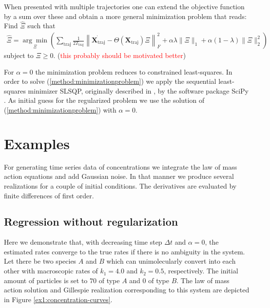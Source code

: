 \documentclass[oneside, abstracton, titlepage]{scrartcl}
\begin{document}
	When presented with multiple trajectories one can extend the objective function by a sum over these and obtain a more general minimization problem that reads: Find $\hat{\Xi}$ such that
	\begin{align}
		\hat{\Xi} = \underset{\Xi}{\arg\min}\left( \sum_{\text{traj}}\frac{1}{2T_{\text{traj}}}\left\| \dot{\textbf{X}_\text{traj}} - \Theta(\textbf{X}_\text{traj})\Xi \right\|_F^2 + \alpha\lambda\|\Xi\|_1 + \alpha(1-\lambda)\|\Xi\|_2^2 \right)
	\end{align}
	subject to $\Xi\geq 0$. (\textcolor{red}{this probably should be motivated better})
	
	For $\alpha=0$ the minimization problem reduces to constrained least-squares. In order to solve (\ref{method:minimizationproblem}) we apply the sequential least-squares minimizer SLSQP, originally described in \cite{Kraft1988}, by the software package SciPy \cite{SciPy}. As initial guess for the regularized problem we use the solution of (\ref{method:minimizationproblem}) with $\alpha=0$.
	
	\section{Examples}
	
	For generating time series data of concentrations we integrate the law of mass action equations and add Gaussian noise. In that manner we produce several realizations for a couple of initial conditions. The derivatives are evaluated by finite differences of first order.
	
	\subsection{Regression without regularization}
	\label{sec:ex1}
	
	Here we demonstrate that, with decreasing time step $\Delta t$ and $\alpha=0$, the estimated rates converge to the true rates if there is no ambiguity in the system. Let there be two species $A$ and $B$ which can unimolecularly convert into each other with macroscopic rates of $k_1=4.0$ and $k_2=0.5$, respectively. The initial amount of particles is set to $70$ of type $A$ and $0$ of type $B$. The law of mass action solution and Gillespie realization corresponding to this system are depicted in Figure \ref{ex1:concentration-curves}.
	
\end{document}
